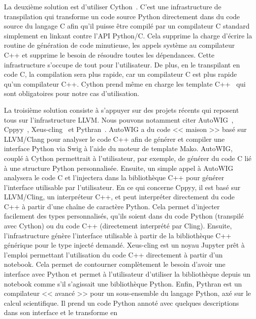 La deuxième solution est d'utiliser Cython~\parencite{behnel.2010.cython}. C'est une infrastructure de transpilation qui
transforme un code source Python directement dans du code source du langage C afin qu'il puisse être compilé par un
compilateur C standard simplement en linkant contre l'API Python/C. Cela supprime la charge d'écrire la routine de
génération de code minutieuse, les appels système au compilateur C++ et supprime le besoin de résoudre toutes les
dépendances. Cette infrastructure s'occupe de tout pour l'utilisateur. De plus, en le transpilant en code C, la
compilation sera plus rapide, car un compilateur C est plus rapide qu'un compilateur C++. Cython prend même en charge
les template C++~\parencite{behnel.2022.cython-template} qui sont obligatoires pour notre cas d'utilisation.

La troisième solution consiste à s'appuyer sur des projets récents qui reposent tous sur l'infrastructure LLVM. Nous
pouvons notamment citer AutoWIG~\parencite{fernique.2018.autowig}, Cppyy~\parencite{wimtlplavrijsen.2016.cppyy},
Xeus-cling~\parencite{quantstack.2021.xeus-cling} et Pythran~\parencite{guelton.2015.pythran}. AutoWIG a du code <<
maison >> basé sur LLVM/Clang pour analyser le code C++ afin de générer et compiler une interface Python via Swig à
l'aide du moteur de template Mako. AutoWIG, couplé à Cython permettrait à l'utilisateur, par exemple, de générer du code
C lié à une structure Python personnalisée. Ensuite, un simple appel à AutoWIG analysera le code C et l'injectera dans
la bibliothèque C++ pour générer l'interface utilisable par l'utilisateur. En ce qui concerne Cppyy, il est basé sur
LLVM/Cling, un interpréteur C++, et peut interpréter directement du code C++ à partir d'une chaîne de caractère Python.
Cela permet d'injecter facilement des types personnalisés, qu'ils soient dans du code Python (transpilé avec Cython) ou
du code C++ (directement interprété par Cling). Ensuite, l'infrastructure génère l'interface utilisable à partir de la
bibliothèque C++ générique pour le type injecté demandé. Xeus-cling est un noyau Jupyter prêt à l'emploi permettant
l'utilisation du code C++ directement à partir d'un notebook. Cela permet de contourner complètement le besoin d'avoir
une interface avec Python et permet à l'utilisateur d'utiliser la bibliothèque depuis un notebook comme s'il s'agissait
une bibliothèque Python. Enfin, Pythran est un compilateur << avancé >> pour un sous-ensemble du langage Python, axé sur
le calcul scientifique. Il prend un code Python annoté avec quelques descriptions dans son interface et le transforme en
